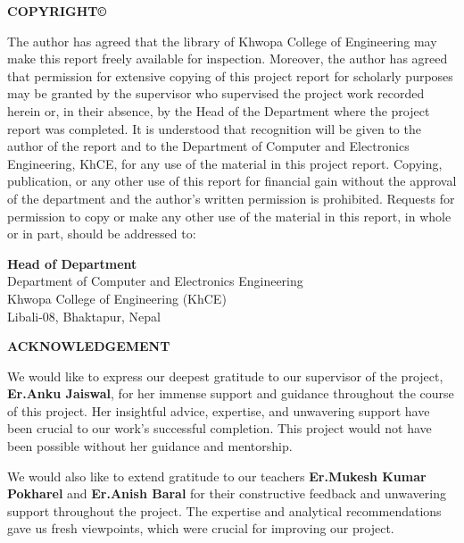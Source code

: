 \begin{center}
    {\Large\bfseries COPYRIGHT\copyright}
\end{center}
\vspace{1em}
\normalsize
\justify
The author has agreed that the library of Khwopa College of Engineering may make this report freely available for inspection. Moreover, the author has agreed that permission for extensive copying of this project report for scholarly purposes may be granted by the supervisor who supervised the project work recorded herein or, in their absence, by the Head of the Department where the project report was completed. It is understood that recognition will be given to the author of the report and to the Department of Computer and Electronics Engineering, KhCE, for any use of the material in this project report. Copying, publication, or any other use of this report for financial gain without the approval of the department and the author's written permission is prohibited. Requests for permission to copy or make any other use of the material in this report, in whole or in part, should be addressed to:

\vspace{1.5cm}
\noindent\textbf{Head of Department} \\
Department of Computer and Electronics Engineering \\
Khwopa College of Engineering (KhCE) \\
Libali-08, Bhaktapur, Nepal
\newpage

\begin{center}
    {\Large\bfseries ACKNOWLEDGEMENT}
\end{center}
\vspace{1.2cm}
\normalsize
\noindent
We would like to express our deepest gratitude to our supervisor of the project, \textbf{Er.Anku Jaiswal}, for her immense support and guidance throughout the course of this project. Her insightful advice, expertise, and unwavering support have been crucial to our work's successful completion. This project would not have been possible without her guidance and mentorship.

\noindent We would also like to extend gratitude to our teachers \textbf{Er.Mukesh Kumar Pokharel} and \textbf{Er.Anish Baral} for their constructive feedback and unwavering support throughout the project. The expertise and analytical recommendations gave us fresh viewpoints, which were crucial for improving our project.

